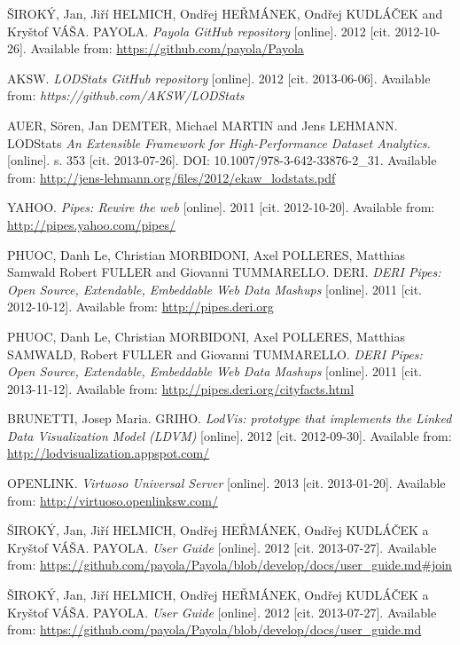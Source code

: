 \begin{thebibliography}{99}
{\sc ŠIROKÝ,} Jan, Jiří HELMICH, Ondřej HEŘMÁNEK, Ondřej KUDLÁČEK and Kryštof VÁŠA. PAYOLA.
\emph{Payola GitHub repository} [online]. 2012 [cit. 2012-10-26].
Available from: \url{https://github.com/payola/Payola}

{\sc AKSW.}
\emph{LODStats GitHub repository} [online]. 2012 [cit. 2013-06-06].
Available from: \emph{https://github.com/AKSW/LODStats}
 
{\sc AUER,} Sören, Jan DEMTER, Michael MARTIN and Jens LEHMANN. 
LODStats
\emph{An Extensible Framework for High-Performance Dataset Analytics.}
[online]. s. 353 [cit. 2013-07-26]. DOI: 10.1007/978-3-642-33876-2\_31.
Available from: \url{http://jens-lehmann.org/files/2012/ekaw_lodstats.pdf}

{\sc YAHOO.}
\emph{Pipes: Rewire the web} [online]. 2011 [cit. 2012-10-20].
Available from: \url{http://pipes.yahoo.com/pipes/}

{\sc PHUOC,} Danh Le, Christian MORBIDONI, Axel POLLERES,
Matthias Samwald Robert FULLER and Giovanni TUMMARELLO. DERI.
\emph{DERI Pipes: Open Source, Extendable, Embeddable Web Data Mashups} [online].
2011 [cit. 2012-10-12]. 
Available from: \url{http://pipes.deri.org}

{\sc PHUOC,} Danh Le, Christian MORBIDONI, Axel POLLERES,
Matthias SAMWALD, Robert FULLER and Giovanni TUMMARELLO.
\emph{DERI Pipes: Open Source, Extendable, Embeddable Web Data Mashups} [online]. 2011
[cit. 2013-11-12].
Available from: \url{http://pipes.deri.org/cityfacts.html}

{\sc BRUNETTI,} Josep Maria. GRIHO.
\emph{LodVis: prototype that implements the Linked Data Visualization Model (LDVM)}
[online]. 2012 [cit. 2012-09-30].
Available from: \url{http://lodvisualization.appspot.com/}

{\sc OPENLINK.}
\emph{Virtuoso Universal Server} [online]. 2013 [cit. 2013-01-20].
Available from: \url{http://virtuoso.openlinksw.com/}

{\sc ŠIROKÝ,} Jan, Jiří HELMICH, Ondřej HEŘMÁNEK, Ondřej KUDLÁČEK a Kryštof VÁŠA. PAYOLA.
\emph{User Guide} [online]. 2012 [cit. 2013-07-27]. 
Available from: \url{https://github.com/payola/Payola/blob/develop/docs/user_guide.md#join}

{\sc ŠIROKÝ,} Jan, Jiří HELMICH, Ondřej HEŘMÁNEK, Ondřej KUDLÁČEK a Kryštof VÁŠA. PAYOLA.
\emph{User Guide} [online]. 2012 [cit. 2013-07-27]. 
Available from: \url{https://github.com/payola/Payola/blob/develop/docs/user_guide.md}


\end{thebibliography}
